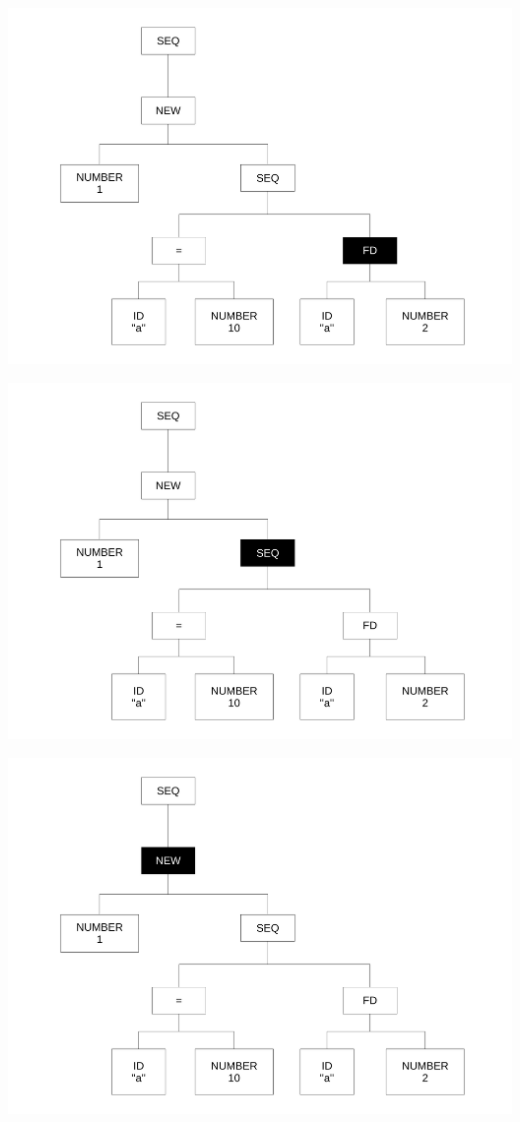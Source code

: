 \begin{frame}
\includegraphics[scale=0.3]{doc/Presentation/img/arbre7.pdf}
\end{frame}

\begin{frame}
\includegraphics[scale=0.3]{doc/Presentation/img/arbre8.pdf}
\end{frame}

\begin{frame}
\includegraphics[scale=0.3]{doc/Presentation/img/arbre9.pdf}
\end{frame}

